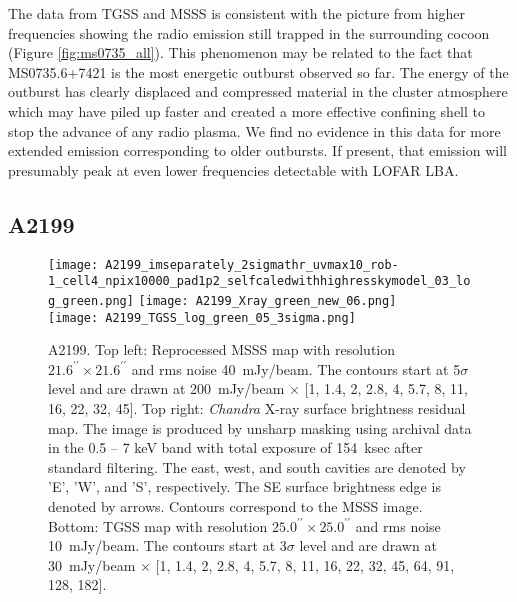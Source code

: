 \documentclass{aa}  %
\begin{document}
The data from TGSS and MSSS is consistent with the picture from higher frequencies showing the radio emission still trapped in the surrounding cocoon (Figure \ref{fig:ms0735_all}). 
This phenomenon may be related to the fact that MS0735.6+7421 is the most energetic outburst observed so far.
The energy of the outburst has clearly displaced and compressed material in the cluster atmosphere which may have piled up faster and created a more effective confining shell to stop the advance of any radio plasma.
We find no evidence in this data for more extended emission corresponding to older outbursts.
If present, that emission will presumably peak at even lower frequencies detectable with LOFAR LBA.


   
\subsection{A2199}
\label{sec:A2199}


\begin{figure*}[t]
\begin{center}
\texttt{[image: A2199\_imseparately\_2sigmathr\_uvmax10\_rob-1\_cell4\_npix10000\_pad1p2\_selfcaledwithhighresskymodel\_03\_log\_green.png]}
\texttt{[image: A2199\_Xray\_green\_new\_06.png]} \\
\texttt{[image: A2199\_TGSS\_log\_green\_05\_3sigma.png]}
\end{center}
\caption{\small A2199. Top left: Reprocessed MSSS map with resolution $21.6^{\prime\prime}\times21.6^{\prime\prime}$ and rms noise 40~mJy/beam. The contours start at 5$\sigma$ level and are drawn at 200~mJy/beam $\times$ [1, 1.4, 2, 2.8, 4, 5.7, 8, 11, 16, 22, 32, 45]. Top right: \textit{Chandra} X-ray surface brightness residual map. The image is produced by unsharp masking using archival data in the 0.5 -- 7 keV band with total exposure of 154~ksec after standard filtering. The east, west, and south cavities are denoted by 'E', 'W', and 'S', respectively. The SE surface brightness edge is denoted by arrows. Contours correspond to the MSSS image. Bottom: TGSS map with resolution $25.0^{\prime\prime}\times25.0^{\prime\prime}$ and rms noise 10~mJy/beam. The contours start at 3$\sigma$ level and are drawn at 30~mJy/beam $\times$ [1, 1.4, 2, 2.8, 4, 5.7, 8, 11, 16, 22, 32, 45, 64, 91, 128, 182]. 
\label{fig:a2199_all}}
\vspace{0.15in}
\end{figure*}
  
\end{document}
